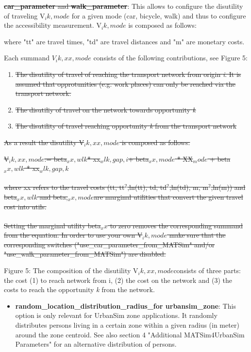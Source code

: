 \begin{itemize}
\begin{itemize}
\sout{\textbf{car\_parameter} and \textbf{walk\_parameter}}: This allows to configure the disutility of traveling V$_ik,mode$ for a given mode (car, bicycle, walk) and thus to configure the accessibility measurement. V$_ik,mode$ is composed as follows:


     where "tt" are travel times, "td" are travel distances and "m" are monetary costs.

     Each summand $V_ik,xx,mode$ consists of the following contributions, see Figure 5:
\begin{enumerate}
	\item \sout{The disutility of travel of reaching the transport network from origin \emph{i}. It is assumed that opprotunities (e.g. work places) can only be reached via the transport network.}
	\item \sout{The disutiliy of travel on the network towards opportunity \emph{k}}
	\item \sout{The disutility of travel reaching opportunity \emph{k} from the transport network}
\end{enumerate}
\end{itemize}
\end{itemize}

\sout{As a result the disutility V$_ik,xx,mode$ is composed as follows:}

\sout{V$_ik,xx,mode$:= beta$_xx,wlk$* xx$_wlk,gap,i $+ beta$_xx,mode$ * XX$_mode$ + beta$_xx,wlk$ * xx$_wlk,gap,k$
\\
\\  where xx refers to the travel costs (tt, tt$^2$,ln(tt), td, td$^2$,ln(td), m, m$^2$,ln(m)) and beta$_xx,wlk$ and beta,$_xx,mode $are marginal utilities that convert the given travel cost into utils.
\\
\\  Setting the marginal utility beta$_xx$ to zero removes the corresponding summand from the equation. In order to use your own V$_ik,mode$  make sure that the corresponding switches  ("use\_car\_parameter\_from\_MATSim" and/or  "use\_walk\_parameter\_from\_MATSim") are disabled.}



Figure 5: The composition of the disutility V$_ik,xx,mode $consists  of three parts: the cost (1) to reach network from i, (2) the cost on  the network and (3) the costs to reach the opportunity \emph{k} from the network.
\begin{itemize}
	\item \textbf{random\_location\_distribution\_radius\_for urbansim\_zone}:  This option is only relevant for UrbanSim zone applications. It  randomly distributes persons living in a certain zone within a given  radius (in meter) around the zone centroid. See also section 4  "Additional MATSim4UrbanSim Parameters" for an alternative distribution  of persons.
\end{itemize}


